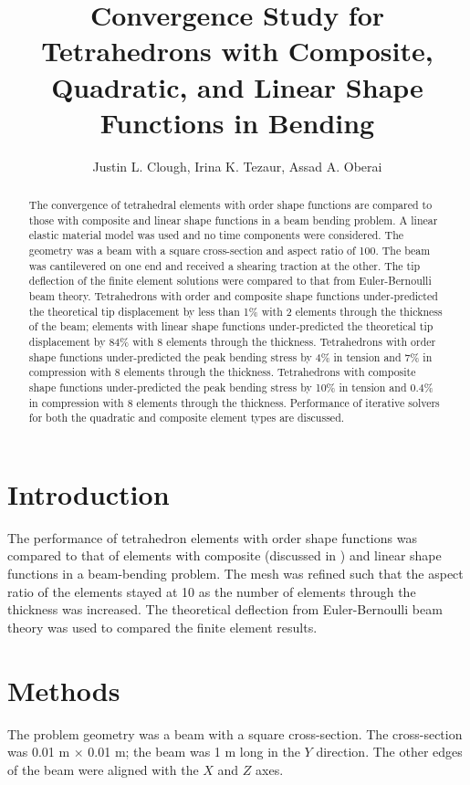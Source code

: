 \documentclass[a4paper, 12pt]{article}
\author{Justin L. Clough, 
        Irina K. Tezaur,
        Assad A. Oberai}
\title{Convergence Study for Tetrahedrons with Composite, Quadratic, and Linear Shape Functions in Bending}
\begin{document}
\maketitle

\begin{abstract}
The convergence of tetrahedral elements with
 order shape functions are compared to those with composite
and linear shape functions
in a beam bending problem.
A linear elastic material model was used
and no time components were considered.
The geometry was a beam with a square cross-section and 
aspect ratio of 100.
The beam was cantilevered on one end and received a 
shearing traction at the other. 
The tip deflection of the finite element solutions were
compared to that from Euler-Bernoulli beam theory. 
Tetrahedrons with  order and composite shape functions under-predicted
the theoretical tip displacement by less than 1\% with 2 elements  
through the thickness of the beam;
elements with linear shape functions under-predicted 
the theoretical tip displacement by 84\% with 8 elements through the thickness.
Tetrahedrons with  order shape functions under-predicted 
the peak bending stress by 4\% in tension and 7\% in compression
with 8 elements through the thickness.
Tetrahedrons with composite shape functions under-predicted 
the peak bending stress by 10\% in tension and 0.4\% in compression
with 8 elements through the thickness.
Performance of iterative solvers for both the 
quadratic and composite element types are discussed.

\end{abstract}

\section{Introduction}
The performance of tetrahedron elements with  order shape functions
was compared to that of elements with composite
(discussed in \cite{bib:composite_tet})
and linear shape functions in a beam-bending problem.
The mesh was refined such that the aspect ratio of the elements
stayed at 10 as the number of elements through the thickness was increased.
The theoretical deflection from Euler-Bernoulli beam theory was used to
compared the finite element results.

\section{Methods}
The problem geometry was a beam with a square cross-section.
The cross-section was 0.01 m $ \times $ 0.01 m; 
the beam was 1 m long in the $Y$ direction.
The other edges of the beam were aligned with the $X$ and $Z$ axes.
\end{document}
